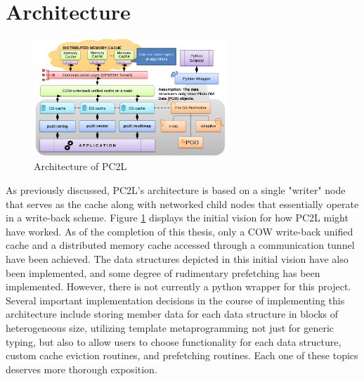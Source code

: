 \section{Architecture}
\begin{figure}[h]
\centering
\includegraphics[width=0.65\textwidth]{Figures/pc2l_architecture.png}
\caption{Architecture of PC2L}
\label{fig:pc2l_architecture}
\end{figure}
As previously discussed, PC2L's architecture is based on a single "writer" node that serves as the cache along with networked child nodes that essentially operate in a write-back scheme. Figure \ref{fig:pc2l_architecture} displays the initial vision for how PC2L might have worked. As of the completion of this thesis,  only a COW write-back unified cache and a distributed memory cache accessed through a communication tunnel have been achieved. The data structures depicted in this initial vision have also been implemented, and some degree of rudimentary prefetching has been implemented. However, there is not currently a python wrapper for this project. Several important implementation decisions in the course of implementing this architecture include storing member data for each data structure in blocks of heterogeneous size, utilizing template metaprogramming not just for generic typing, but also to allow users to choose functionality for each data structure, custom cache eviction routines, and prefetching routines. Each one of these topics deserves more thorough exposition. 

